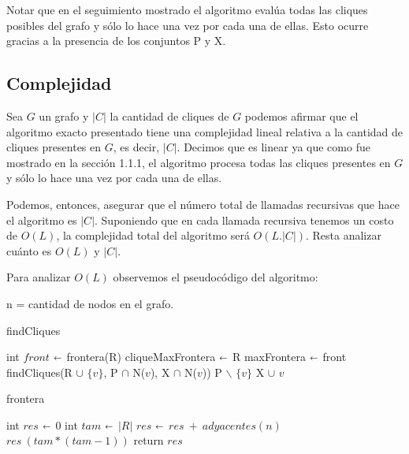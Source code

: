 Notar que en el seguimiento mostrado el algoritmo evalúa todas las cliques posibles del grafo y sólo lo hace una vez por cada una de ellas. Esto ocurre gracias a la presencia de los conjuntos P y X.

\subsection{Complejidad}

Sea $G$ un grafo y $|C|$ la cantidad de cliques de $G$ podemos afirmar que el algoritmo exacto presentado tiene una complejidad lineal relativa a la cantidad de cliques presentes en $G$, es decir, $|C|$. Decimos que es linear ya que como fue mostrado en la sección 1.1.1, el algoritmo procesa todas las cliques presentes en $G$ y sólo lo hace una vez por cada una de ellas.

Podemos, entonces, asegurar que el número total de llamadas recursivas que hace el algoritmo es $|C|$. Suponiendo que en cada llamada recursiva tenemos un costo de $O(L)$, la complejidad total del algoritmo será $O(L.|C|)$. Resta analizar cuánto es $O(L)$ y $|C|$.

Para analizar $O(L)$ observemos el pseudocódigo del algoritmo:

n = cantidad de nodos en el grafo.

\begin{algorithm}[H]
\caption{findCliques}\label{ej1}
\begin{algorithmic}[1]
	\State int $front$ $\shortleftarrow$ frontera(R) 
		\State cliqueMaxFrontera $\shortleftarrow$ R 
		\State maxFrontera $\shortleftarrow$ front 
	\EndIf
		\State findCliques(R $\cup$ $\{v\}$, P $\cap$ N($v$), X $\cap$ N($v$))  
	\EndFor
	\State P $\backslash$ $\{v\}$ 
	\State X $\cup$ $v$ 
\EndProcedure
\end{algorithmic}
\end{algorithm}

\begin{algorithm}[H]
\caption{frontera}\label{ej1}
\begin{algorithmic}[1]
	\State int $res$ $\shortleftarrow$ 0 
	\State int $tam$ $\shortleftarrow$ $|R|$ 
	 
		\State $res$ $\shortleftarrow$ $res \ + \ adyacentes(n)$ 
	\EndFor
	\State $res \ (tam*(tam-1))$ 
	\State return $res$ 
\EndProcedure
\end{algorithmic}
\end{algorithm}

